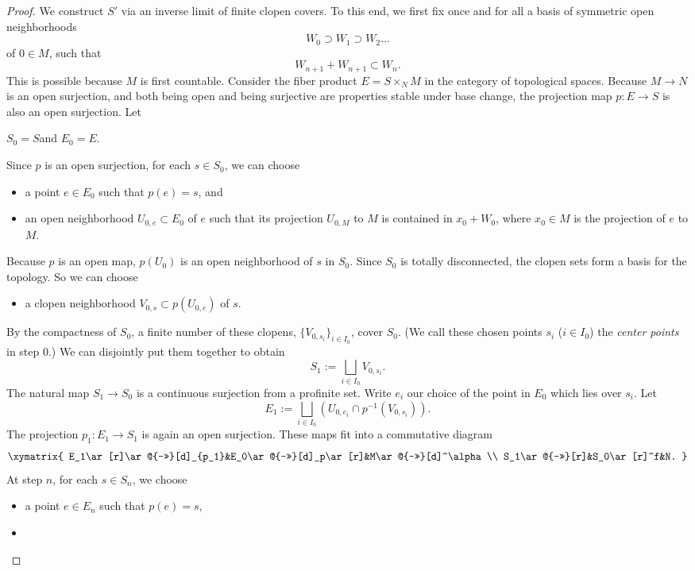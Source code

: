 \documentclass[11pt]{amsart}
\newcommand{\ra}{\rightarrow} %
\theoremstyle{plain}
\theoremstyle{definition}
\numberwithin{equation}{prop}
\begin{document}
\begin{proof}
We construct $S'$ via an inverse limit of finite clopen covers. 
To this end, we first fix once and for all a basis of symmetric open neighborhoods 
$$W_0 \supset W_1 \supset W_2 \dots$$
of $0 \in M$, such that  
$$W_{n+1} + W_{n+1} \subset W_n.$$
This is possible because $M$ is first countable.
Consider the fiber product $E = S \times_N M$ in the category of topological spaces. 
Because $M \ra N$ is an open surjection, and both being open and being surjective are properties stable under base change, the projection map $p: E \ra S$ is also an open surjection. 
Let 
\begin{center}
$S_0 = S$\qquad  and \qquad $E_0 = E$. 
\end{center}
Since $p$ is an open surjection, for each $s \in S_0$, we can choose
\begin{itemize} 
\item 
a point $e \in E_0$ such that $p(e) = s$, and 
\item 
an open neighborhood $U_{0,e} \subset E_0$ of $e$ such that its projection $U_{0,M}$ to $M$ is contained in $x_0+W_0$, where $x_0\in M$ is the projection of $e$ to $M$.
\end{itemize} 
Because $p$ is an open map, $p(U_0)$ is an open neighborhood of $s$ in $S_0$. 
Since $S_0$ is totally disconnected,  the clopen sets form a basis for the topology. So we can choose 
\begin{itemize} 
\item 
a clopen neighborhood $V_{0,s} \subset p(U_{0,e})$ of $s$. 
\end{itemize}
By the compactness of $S_0$, a finite number of these clopens, 
$\{V_{0,s_i}\}_{i\in I_0}$, cover $S_0$.
(We call these chosen points $s_i$ ($i\in I_0$) the \textit{center points} in step 0.)
We can disjointly put them together to obtain
$$S_1 := \bigsqcup_{i \in I_0} V_{0,s_i}.$$
The natural map $S_1 \ra S_0$ is a continuous surjection from a profinite set. 
Write $e_i$ our choice of the point in $E_0$ which lies over $s_i$.
Let 
$$E_1 := \bigsqcup_{i \in I_0} (U_{0,e_i} \cap p^{-1}(V_{0,s_i})).$$
The projection $p_1: E_1 \ra S_1$ is again an open surjection.
These maps fit into a commutative diagram
$$\xymatrix{
E_1\ar[r]\ar@{->>}[d]_{p_1}&E_0\ar@{->>}[d]_p\ar[r]&M\ar@{->>}[d]^\alpha\\
S_1\ar@{->>}[r]&S_0\ar[r]^f&N.
}$$
At step $n$, for each $s\in S_n$, we choose 
\begin{itemize}
\item 
a point $e\in E_n$ such that $p(e)=s$,
\item 

\end{itemize}
\end{proof}
\end{document}
